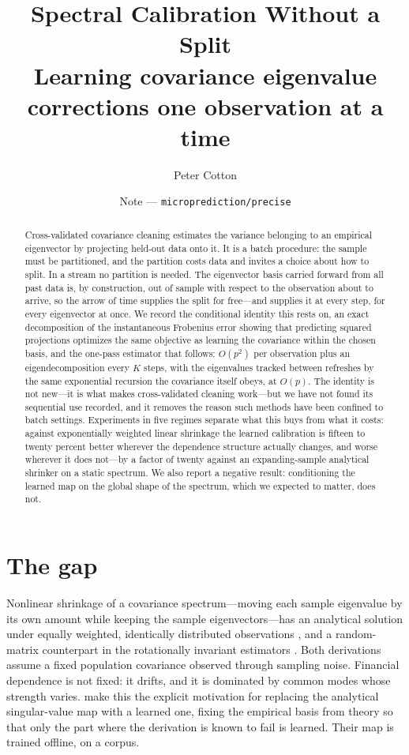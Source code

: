 \documentclass[11pt]{article}
\title{\vspace{-2em}Spectral Calibration Without a Split\\[0.3em]
       \large Learning covariance eigenvalue corrections one observation at a time}
\author{Peter Cotton}
\date{Note --- \texttt{microprediction/precise}}
\begin{document}
\maketitle

\begin{abstract}
\noindent
Cross-validated covariance cleaning estimates the variance belonging to an empirical eigenvector by
projecting held-out data onto it. It is a batch procedure: the sample must be partitioned, and the
partition costs data and invites a choice about how to split. In a stream no partition is needed.
The eigenvector basis carried forward from all past data is, by construction, out of sample with
respect to the observation about to arrive, so the arrow of time supplies the split for free---and
supplies it at every step, for every eigenvector at once. We record the conditional identity this
rests on, an exact decomposition of the instantaneous Frobenius error showing that predicting
squared projections optimizes the same objective as learning the covariance within the chosen basis,
and the one-pass estimator that follows: $O(p^2)$ per observation plus an eigendecomposition every
$K$ steps, with the eigenvalues tracked between refreshes by the same exponential recursion the
covariance itself obeys, at $O(p)$. The identity is not new---it is what makes cross-validated
cleaning work---but we have not found its sequential use recorded, and it removes the reason such
methods have been confined to batch settings. Experiments in five regimes separate what
this buys from what it costs: against exponentially weighted linear shrinkage the learned
calibration is fifteen to twenty percent better wherever the dependence structure actually changes,
and worse wherever it does not---by a factor of twenty against an expanding-sample analytical
shrinker on a static spectrum. We also report a negative result: conditioning the learned map on the
global shape of the spectrum, which we expected to matter, does not.
\end{abstract}

\section{The gap}

Nonlinear shrinkage of a covariance spectrum---moving each sample eigenvalue by its own amount while
keeping the sample eigenvectors---has an analytical solution under equally weighted, identically
distributed observations \citep{ledoitpeche2011,ledoitwolf2020analytical}, and a random-matrix
counterpart in the rotationally invariant estimators \citep{bun2017cleaning}. Both derivations assume
a fixed population covariance observed through sampling noise. Financial dependence is not fixed: it
drifts, and it is dominated by common modes whose strength varies. \citet{manolakis2026} make this
the explicit motivation for replacing the analytical singular-value map with a learned one, fixing
the empirical basis from theory so that only the part where the derivation is known to fail is
learned. Their map is trained offline, on a corpus.
\end{document}
